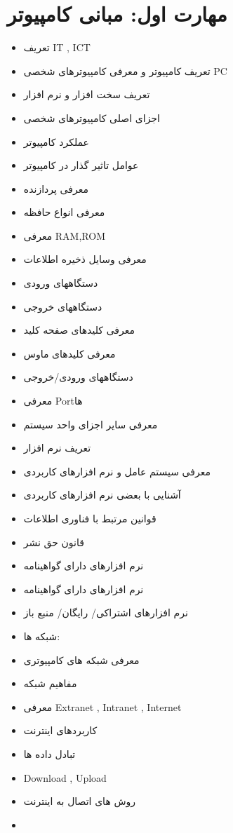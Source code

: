 \section{مهارت اول: مبانی کامپیوتر}

\begin{itemize}
\item
تعریف IT , ICT
\item
تعریف کامپیوتر و معرفی کامپیوترهای شخصی PC
\item
تعریف سخت افزار و نرم افزار
\item
اجزای اصلی کامپیوترهای شخصی
\item
عملکرد کامپیوتر
\item
عوامل تاثیر گذار در کامپیوتر
\item
معرفی پردازنده
\item
معرفی انواع حافظه
\item
معرفی RAM,ROM
\item
معرفی وسایل ذخیره اطلاعات
\item
دستگاههای ورودی
\item
دستگاههای خروجی
\item
معرفی کلیدهای صفحه کلید
\item
معرفی کلیدهای ماوس
\item
دستگاههای ورودی/خروجی
\item
معرفی Portها
\item
معرفی سایر اجزای واحد سیستم
\item
تعریف نرم افزار
\item
معرفی سیستم عامل و نرم افزارهای کاربردی
\item
آشنایی با بعضی نرم افزارهای کاربردی
\item
قوانین مرتبط با فناوری اطلاعات
\item
قانون حق نشر
\item
نرم افزارهای دارای گواهینامه
\item
نرم افزارهای دارای گواهینامه
\item
نرم افزارهای اشتراکی/ رایگان/ منبع باز
\item
شبکه ها:
\item
معرفی شبکه های کامپیوتری
\item
مفاهیم شبکه
\item
معرفی Extranet , Intranet , Internet
\item
کاربردهای اینترنت
\item
تبادل داده ها
\item
Download , Upload
\item
روش های اتصال به اینترنت
\item

\end{itemize}
